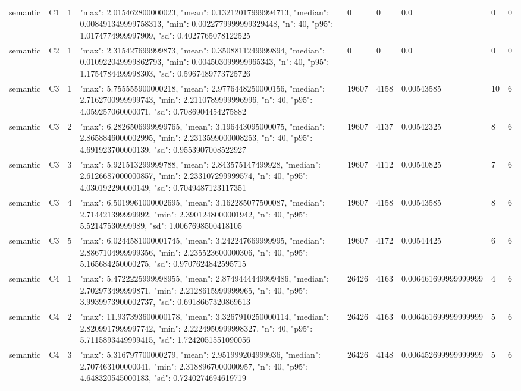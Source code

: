 \begin{tabular}{lllllllll}
semantic & C1 & 1 & {"max": 2.015462800000023, "mean": 0.13212017999994713, "median": 0.008491349999758313, "min": 0.0022779999999329448, "n": 40, "p95": 1.0174774999997909, "sd": 0.4027765078122525} & 0 & 0 & 0.0 & 0 & 0 \\
semantic & C2 & 1 & {"max": 2.315427699999873, "mean": 0.3508811249999894, "median": 0.010922049999862793, "min": 0.004503099999965343, "n": 40, "p95": 1.1754784499998303, "sd": 0.5967489773725726} & 0 & 0 & 0.0 & 0 & 0 \\
semantic & C3 & 1 & {"max": 5.755555900000218, "mean": 2.9776448250000156, "median": 2.7162700999999743, "min": 2.2110789999996996, "n": 40, "p95": 4.059257060000071, "sd": 0.7086904454275882} & 19607 & 4158 & 0.00543585 & 10 & 6 \\
semantic & C3 & 2 & {"max": 6.2826506999999765, "mean": 3.196443095000075, "median": 2.8658846000002995, "min": 2.2313599000008253, "n": 40, "p95": 4.691923700000139, "sd": 0.9553907008522927} & 19607 & 4137 & 0.00542325 & 8 & 6 \\
semantic & C3 & 3 & {"max": 5.921513299999788, "mean": 2.843575147499928, "median": 2.6126687000000857, "min": 2.233107299999574, "n": 40, "p95": 4.030192290000149, "sd": 0.7049487123117351} & 19607 & 4112 & 0.00540825 & 7 & 6 \\
semantic & C3 & 4 & {"max": 6.5019961000002695, "mean": 3.162285077500087, "median": 2.714421399999992, "min": 2.3901248000001942, "n": 40, "p95": 5.52147530999989, "sd": 1.0067698500418105} & 19607 & 4158 & 0.00543585 & 8 & 6 \\
semantic & C3 & 5 & {"max": 6.0244581000001745, "mean": 3.242247669999995, "median": 2.8867104999999356, "min": 2.235523600000306, "n": 40, "p95": 5.165684250000275, "sd": 0.9707624842595715} & 19607 & 4172 & 0.00544425 & 6 & 6 \\
semantic & C4 & 1 & {"max": 5.4722225999998955, "mean": 2.8749444449999486, "median": 2.702973499999871, "min": 2.2128615999999965, "n": 40, "p95": 3.9939973900002737, "sd": 0.6918667320869613} & 26426 & 4163 & 0.006461699999999999 & 4 & 6 \\
semantic & C4 & 2 & {"max": 11.937393600000178, "mean": 3.3267910250000114, "median": 2.8209917999997742, "min": 2.2224950999998327, "n": 40, "p95": 5.7115893449999415, "sd": 1.7242051551090056} & 26426 & 4163 & 0.006461699999999999 & 5 & 6 \\
semantic & C4 & 3 & {"max": 5.316797700000279, "mean": 2.951999204999936, "median": 2.707463100000041, "min": 2.3188967000000957, "n": 40, "p95": 4.648320545000183, "sd": 0.7240274694619719} & 26426 & 4148 & 0.006452699999999999 & 5 & 6 \\

\end{tabular}
